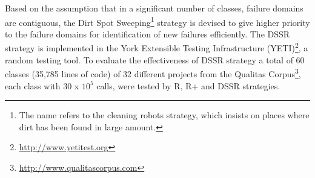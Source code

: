 \documentclass[conference]{IEEEtran}
\begin{document}
Based on the assumption that in a significant number of classes, failure domains are contiguous, the Dirt Spot Sweeping\footnote{The name refers to the cleaning robots strategy, which insists on places where dirt has been found in large amount.} strategy is devised to give higher priority to the failure domains for identification of new failures efficiently. 
The DSSR strategy is implemented in the York Extensible Testing Infrastructure (YETI)\footnote{\url{http://www.yetitest.org}}, a random testing tool. To evaluate the effectiveness of DSSR strategy a total of 60 classes (35,785 lines of code) of 32 different projects from the Qualitas Corpus\footnote{\url{http://www.qualitascorpus.com}}, each class with 30 x ${10^5}$ calls, were tested by R, R+ and DSSR strategies.

\end{document}
